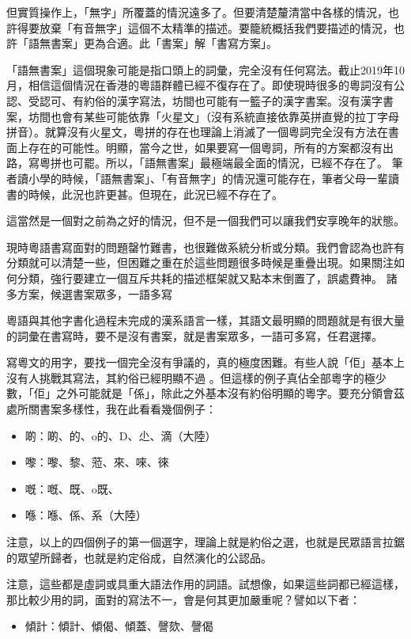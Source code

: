 \documentclass[a5paper, 10pt, openany]{book} %
\begin{document}
但實質操作上，「無字」所覆蓋的情況遠多了。但要清楚釐清當中各樣的情況，也許得要放棄「有音無字」這個不太精準的描述。要籠統概括我們要描述的情況，也許「語無書案」更為合適。此「書案」解「書寫方案」。

「語無書案」這個現象可能是指口頭上的詞彙，完全沒有任何寫法。截止2019年10月，相信這個情況在香港的粵語群體已經不復存在了。即使現時很多的粵詞沒有公認、受認可、有約俗的漢字寫法，坊間也可能有一籃子的漢字書案。沒有漢字書案，坊間也會有某些可能依靠「火星文」（沒有系統直接依靠英拼直覺的拉丁字母拼音）。就算沒有火星文，粵拼的存在也理論上消滅了一個粵詞完全沒有方法在書面上存在的可能性。明顯，當今之世，如果要寫一個粵詞，所有的方案都沒有出路，寫粵拼也可罷。所以，「語無書案」最極端最全面的情況，已經不存在了。 筆者讀小學的時候，「語無書案」、「有音無字」的情況還可能存在，筆者父母一輩讀書的時候，此況也許更甚。但現在，此況已經不存在了。 

這當然是一個對之前為之好的情況，但不是一個我們可以讓我們安享晚年的狀態。

現時粵語書寫面對的問題罄竹難書，也很難做系統分析或分類。我們會認為也許有分類就可以清楚一些，但困難之重在於這些問題很多時候是重疊出現。如果關注如何分類，強行要建立一個互斥共耗的描述框架就又點本末倒置了，誤處費神。
諸多方案，候選書案眾多，一語多寫

粵語與其他字書化過程未完成的漢系語言一樣，其語文最明顯的問題就是有很大量的詞彙在書寫時，要不是沒有書案，就是書案眾多，一語可多寫，任君選擇。

寫粵文的用字，要找一個完全沒有爭議的，真的極度困難。有些人說「佢」基本上沒有人挑戰其寫法，其約俗已經明顯不過 。但這樣的例子真佔全部粵字的極少數，「佢」之外可能就是「係」，除此之外基本沒有約俗明顯的粵字。要充分領會茲處所關書案多樣性，我在此看看幾個例子： 


\begin{itemize}
  \item 啲：啲、的、o的、D、尐、滴（大陸）
  \item 嚟：嚟、黎、蒞、來、唻、徠
  \item 嘅：嘅、既、o既、
  \item 喺：喺、係、系（大陸）
\end{itemize}

注意，以上的四個例子的第一個選字，理論上就是約俗之選，也就是民眾語言拉鋸的眾望所歸者，也就是約定俗成，自然演化的公認品。

注意，這些都是虛詞或具重大語法作用的詞語。試想像，如果這些詞都已經這樣，那比較少用的詞，面對的寫法不一，會是何其更加嚴重呢？譬如以下者：

\begin{itemize}
  \item 傾計：傾計、傾偈、傾蓋、謦欬、謦偈
\end{itemize}
\end{document}
